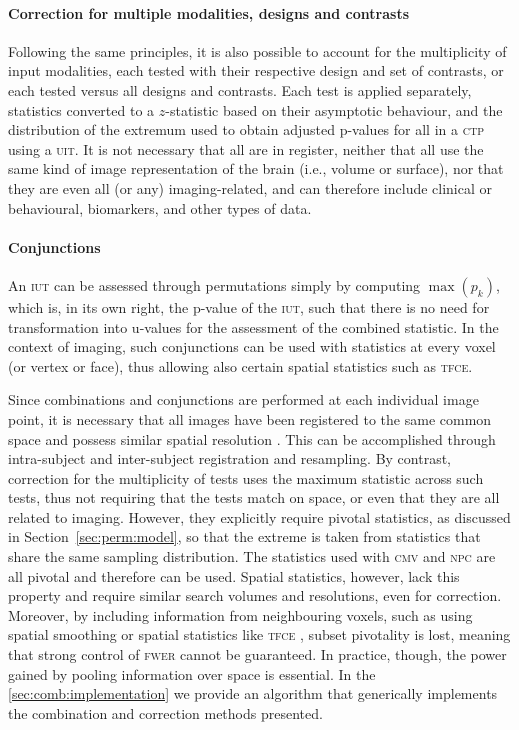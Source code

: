 \paragraph{Correction for multiple modalities, designs and contrasts} Following the same principles, it is also possible to account for the multiplicity of input modalities, each tested with their respective design and set of contrasts, or each tested versus all designs and contrasts. Each test is applied separately, statistics converted to a $z$-statistic based on their asymptotic behaviour, and the distribution of the extremum used to obtain adjusted p-values for all in a \textsc{ctp} using a \textsc{uit}. It is not necessary that all are in register, neither that all use the same kind of image representation of the brain (i.e., volume or surface), nor that they are even all (or any) imaging-related, and can therefore include clinical or behavioural, biomarkers, and other types of data.

\paragraph{Conjunctions} An \textsc{iut} can be assessed through permutations simply by computing $\max \left(p_{k}\right)$, which is, in its own right, the p-value of the \textsc{iut}, such that there is no need for transformation into u-values for the assessment of the combined statistic. In the context of imaging, such conjunctions can be used with statistics at every voxel (or vertex or face), thus allowing also certain spatial statistics such as \textsc{tfce}.

\vspace{10pt}

Since combinations and conjunctions are performed at each individual image point, it is necessary that all images have been registered to the same common space and possess similar spatial resolution \citep{Lazar2002}. This can be accomplished through intra-subject and inter-subject registration and resampling. By contrast, correction for the multiplicity of tests uses the maximum statistic across such tests, thus not requiring that the tests match on space, or even that they are all related to imaging. However, they explicitly require pivotal statistics, as discussed in Section~\ref{sec:perm:model}, so that the extreme is taken from statistics that share the same sampling distribution. The statistics used with \textsc{cmv} and \textsc{npc} are all pivotal and therefore can be used. Spatial statistics, however, lack this property and require similar search volumes and resolutions, even for correction. Moreover, by including information from neighbouring voxels, such as using spatial smoothing or spatial statistics like \textsc{tfce} \citep{Smith2009}, subset pivotality is lost, meaning that strong control of \textsc{fwer} cannot be guaranteed. In practice, though, the power gained by pooling information over space is essential. In the \ref{sec:comb:implementation} we provide an algorithm that generically implements the combination and correction methods presented.

